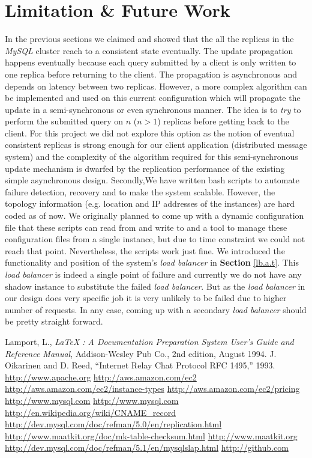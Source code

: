 \documentclass[12pt]{article}
\begin{document}
\section{Limitation \& Future Work}

In the previous sections we claimed and showed that the all the replicas in the \emph{MySQL} cluster reach to a consistent state eventually. The update propagation happens eventually because each query submitted by a client is only written to one replica before returning to the client. The propagation is asynchronous and depends on latency between two replicas. However, a more complex algorithm can be implemented and used on this current configuration which will propagate the update in a semi-synchronous or even synchronous manner. The idea is to \emph{try} to perform the submitted query on $n$ ($n > 1$) replicas before getting back to the client. For this project we did not explore this option as the notion of eventual consistent replicas is strong enough for our client application (distributed message system) and the complexity of the algorithm required for this semi-synchronous update mechanism is dwarfed by the replication performance of the existing simple asynchronous design. Secondly,We have written bash scripts to automate failure detection, recovery and to make the system scalable. However, the topology information (e.g. location and IP addresses of the instances) are hard coded as of now. We originally planned to come up with a dynamic configuration file that these scripts can read from and write to and a tool to manage these configuration files from a single instance, but due to time constraint we could not reach that point. Nevertheless, the scripts work just fine. We introduced the functionality and position of the system\rq{}s \emph{load balancer} in \textbf{Section } \ref{lb.a.t}. This \emph{load balancer} is indeed a single point of failure and currently we do not have any shadow instance to substitute the failed \emph{load balancer}. But as the \emph{load balancer} in our design does very specific job it is very unlikely to be failed due to higher number of requests. In any case, coming up with a secondary \emph{load balancer} should be pretty straight forward. 

\begin{thebibliography}{99}
 Lamport, L., {\it LaTeX : A Documentation
 Preparation System User's Guide and Reference Manual}, Addison-Wesley
 Pub Co., 2nd edition, August 1994.
 J. Oikarinen and D. Reed, “Internet Relay Chat Protocol
RFC 1495,” 1993.
 \url{http://www.apache.org}
  \url{http://aws.amazon.com/ec2}
 \url{http://aws.amazon.com/ec2/instance-types}
\url{http://aws.amazon.com/ec2/pricing}
 \url{http://www.mysql.com}
 \url{http://www.mysql.com}
 \url{http://en.wikipedia.org/wiki/CNAME\_record}
 \url{http://dev.mysql.com/doc/refman/5.0/en/replication.html}
 \url{http://www.maatkit.org/doc/mk-table-checksum.html}
 \url{http://www.maatkit.org}
 \url{http://dev.mysql.com/doc/refman/5.1/en/mysqlslap.html}
 \url{http://github.com}
\end{thebibliography}
\end{document}
